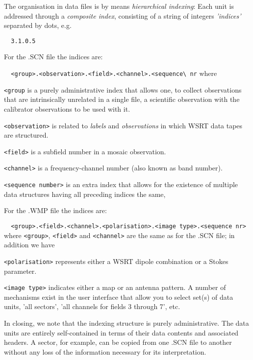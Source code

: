 	The organisation in \NEWSTAR data files is by means {\em hierarchical
indexing}: Each unit is addressed through a {\em composite index}, consisting
of a string of integers {\em 'indices'} separated by dots, e.g.

\verb/  3.1.0.5/

	For the .SCN file the indices are:

\verb/  <group>.<observation>.<field>.<channel>.<sequence\ nr/
where

\bi
\item   \verb/<group/ is a purely administrative index that allows one, \eg to
collect observations that are intrinsically unrelated in a single file,
\eg a scientific observation with the calibrator observations to be used with
it.

\item   \verb/<observation>/ is related to {\em labels} and {\em observations}
in which WSRT data tapes are structured.

\item   \verb/<field>/ is a subfield number in a mosaic observation.

\item   \verb/<channel>/ is a frequency-channel number (also known as band
number).

\item   \verb/<sequence number>/ is an extra index that allows for the
existence of multiple data structures having all preceding indices the same,
\ei

	For the .WMP file the indices are:

\verb/  <group>.<field>.<channel>.<polarisation>.<image type>.<sequence nr>/
%
where \verb/<group>/, \verb/<field>/ and \verb/<channel>/ are the same as for
the .SCN file; in addition we have

\bi
\item   \verb/<polarisation>/ represents either a WSRT dipole combination or a
Stokes parameter.

\item   \verb/<image type>/ indicates either a map or an antenna pattern.
\ei
	A number of mechanisms exist in the user interface that allow you to
select set(s) of data units, \eg 'all sectors', 'all channels for fields 3
through 7', etc.

	In closing, we note that the indexing structure is purely
administrative. The data units are entirely self-contained in terms of their
data contents and associated headers. A sector, for example, can be copied from
one .SCN file to another without any loss of the information necessary for its
interpretation.


